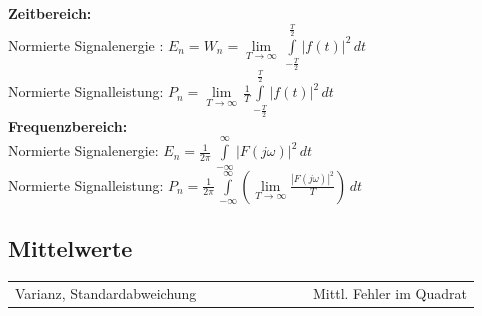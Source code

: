  \begin{multicols}{2}
 \textbf{Zeitbereich:} \\
 Normierte Signalenergie : $E_n = W_n = \lim\limits_{T\to\infty}\,\int\limits_{-\frac{T}{2}}^\frac{T}{2}|f(t)|^2\,dt$ \\
 Normierte Signalleistung: $P_n = \lim\limits_{T\to\infty}\,
 \frac{1}{T}\int\limits_{-\frac{T}{2}}^\frac{T}{2}|f(t)|^2\,dt$ \\
 \textbf{Frequenzbereich:} \\
 Normierte Signalenergie: $E_n = \frac{1}{2\pi}\,\int\limits_{-\infty}^\infty|F(j\omega)|^2\,dt$ \\
 Normierte Signalleistung: $P_n = \frac{1}{2\pi}\,\int\limits_{-\infty}^\infty\left(
 \lim\limits_{T\to\infty}\frac{|F(j\omega)|^2}{T}\right)\,dt$
\end{multicols}
\subsection{Mittelwerte }
\begin{tabular}{p{5cm}p{5.5cm}p{7.5cm}}

	Varianz, Standardabweichung
	& \fbox{$\text{Var}(x)=\sigma^2= \frac {1} {T} \int\limits_{-T/2}^{T/2}
	(x(t)-X_0)^2dt = X^2-X_0^2$}
	& $\qquad \qquad \qquad$ Mittl. Fehler im Quadrat
\end{tabular}
\\ \\	


\newpage
